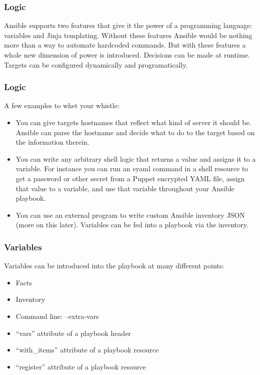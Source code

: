 \documentclass[helvetica,english,utf8,notitle,nologo]{beamer}
\begin{document}
\begin{frame}
  \frametitle{Logic}

  Ansible supports two features that give it the power of a
  programming language: variables and Jinja templating. Without these
  features Ansible would be nothing more than a way to automate
  hardcoded commands. But with these features a whole new dimension of
  power is introduced. Decisions can be made at runtime. Targets can
  be configured dynamically and programatically.
\end{frame}

\begin{frame}
  \frametitle{Logic}

  A few examples to whet your whistle:

  \begin{itemize}
  \item You can give targets hostnames that reflect what kind of
    server it should be. Ansible can parse the hostname and decide
    what to do to the target based on the information therein.
  \item You can write any arbitrary shell logic that returns a value
    and assigns it to a variable. For instance you can run an eyaml
    command in a shell resource to get a password or other secret from
    a Puppet encrypted YAML file, assign that value to a variable, and
    use that variable throughout your Ansible playbook.
  \item You can use an external program to write custom Ansible
    inventory JSON (more on this later). Variables can be fed into a
    playbook via the inventory.
  \end{itemize}
\end{frame}

\begin{frame}
  \frametitle{Variables}

  Variables can be introduced into the playbook at many different
  points:

  \begin{itemize}
  \item Facts
  \item Inventory
  \item Command line: --extra-vars
  \item ``vars'' attribute of a playbook header
  \item ``with\_items'' attribute of a playbook resource
  \item ``register'' attribute of a playbook resource
  \end{itemize}
\end{frame}
\end{document}
